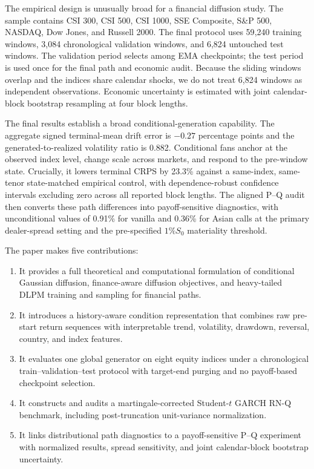﻿\documentclass[12pt,letterpaper]{article}
\begin{document}
The empirical design is unusually broad for a financial diffusion study. The
sample contains CSI 300, CSI 500, CSI 1000, SSE Composite, S\&P 500, NASDAQ,
Dow Jones, and Russell 2000. The final protocol uses 59{,}240 training windows,
3{,}084 chronological validation windows, and 6{,}824 untouched test windows.
The validation period selects among EMA checkpoints; the test period is used
once for the final path and economic audit. Because the sliding windows overlap
and the indices share calendar shocks, we do not treat 6{,}824 windows as
independent observations. Economic uncertainty is estimated with joint
calendar-block bootstrap resampling at four block lengths.

The final results establish a broad conditional-generation capability. The
aggregate signed terminal-mean drift error is $-0.27$ percentage points and the
generated-to-realized volatility ratio is 0.882. Conditional fans anchor at
the observed index level, change scale across markets, and respond to the
pre-window state. Crucially, it lowers terminal CRPS by 23.3\% against a
same-index, same-tenor state-matched empirical control, with dependence-robust
confidence intervals excluding zero across all reported block lengths. The
aligned P--Q audit then converts these path differences into
payoff-sensitive diagnostics, with unconditional values of 0.91\% for vanilla
and 0.36\% for Asian calls at the primary dealer-spread setting and the
pre-specified $1\%S_0$ materiality threshold.

The paper makes five contributions:
\begin{enumerate}
\item It provides a full theoretical and computational formulation of
conditional Gaussian diffusion, finance-aware diffusion objectives, and
heavy-tailed DLPM training and sampling for financial paths.
\item It introduces a history-aware condition representation that combines
raw pre-start return sequences with interpretable trend, volatility,
drawdown, reversal, country, and index features.
\item It evaluates one global generator on eight equity indices under a
chronological train--validation--test protocol with target-end purging and no
payoff-based checkpoint selection.
\item It constructs and audits a martingale-corrected Student-$t$ GARCH RN-Q
benchmark, including post-truncation unit-variance normalization.
\item It links distributional path diagnostics to a payoff-sensitive P--Q
experiment with normalized results, spread sensitivity, and joint
calendar-block bootstrap uncertainty.
\end{enumerate}
\end{document}
